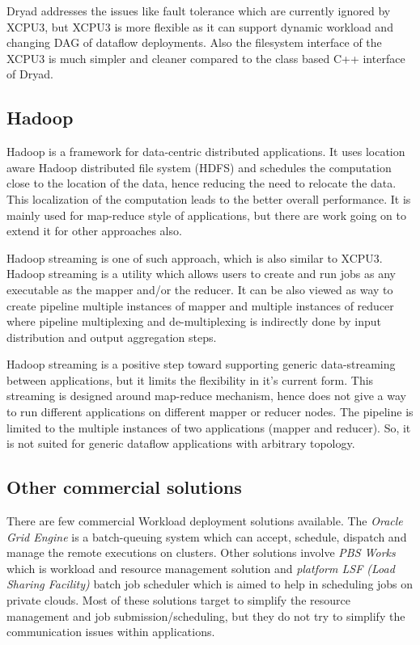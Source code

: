 \documentclass[conference]{IEEEtran}
\begin{document}
Dryad addresses the issues like fault tolerance which are currently ignored by
XCPU3, but XCPU3 is more flexible as it can support dynamic workload and
changing DAG of dataflow deployments. Also the filesystem interface of the XCPU3
is much simpler and cleaner compared to the class based C++ interface of Dryad.

\subsection{Hadoop}
Hadoop is a framework for data-centric distributed applications.   It
uses location aware Hadoop distributed file system (HDFS) and schedules the
computation close to the location of the data, hence reducing the need to
relocate the data.  This localization of the computation leads to the better
overall performance.  It is mainly used for map-reduce style of applications,
but there are work going on to extend it for other approaches also.

Hadoop streaming is one of such approach, which is also similar to XCPU3.
Hadoop streaming is a utility which allows users to create and run jobs as any
executable as the mapper and/or the reducer.  It can be also viewed as way to
create pipeline multiple instances of mapper and multiple instances of reducer
where pipeline multiplexing and de-multiplexing is indirectly done by input
distribution and output aggregation steps.

Hadoop streaming is a positive step toward supporting generic data-streaming
between applications, but it limits the flexibility in it's current form. 
This streaming is designed around map-reduce mechanism, hence does not give a
way to run different applications on different mapper or reducer nodes.  The
pipeline is limited to the multiple instances of two applications
(mapper and reducer).  So, it is not suited for generic dataflow applications
with arbitrary topology.

\subsection{Other commercial solutions}
There are few commercial Workload deployment solutions available.  The
\textit{Oracle Grid Engine}\cite{oge} is a batch-queuing system which can
accept, schedule, dispatch and manage the remote executions on clusters. 
Other solutions involve \textit{PBS Works}\cite{pbsworks} which is workload
and resource management solution and \textit{platform LSF (Load Sharing
Facility)}\cite{platformLSF} batch job scheduler which is aimed to help in
scheduling jobs on private clouds.  Most of these solutions target to simplify
the resource management and job submission/scheduling, but they do not try to
simplify the communication issues within applications.
\end{document}
